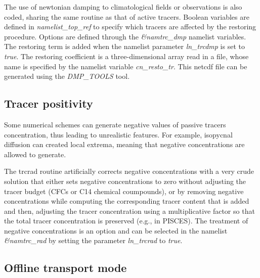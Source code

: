 \documentclass[../main/TOP_manual]{subfiles}
\begin{document}
The use of newtonian damping  to climatological fields or observations is also coded, sharing the same routine as that of active tracers.
Boolean variables are defined in \textit{namelist\_top\_ref} to specify which tracers are affected by the restoring procedure.
Options are defined through the \textit{\&namtrc\_dmp} namelist variables.
The restoring term is added when the namelist parameter \textit{ln\_trcdmp} is set to \textit{true}.
The restoring coefficient is a three-dimensional array read in a file, whose name is specified by the namelist variable \textit{cn\_resto\_tr}.
This netcdf file can be generated using the \textit{DMP\_TOOLS} tool.


\subsection{Tracer positivity}

Some numerical schemes can generate negative values of passive tracers concentration, thus leading to unrealistic features.
For example, isopycnal diffusion can created local extrema, meaning that negative concentrations are allowed to generate.

The trcrad routine artificially corrects negative concentrations with a very crude solution that either sets negative concentrations to zero without adjusting the tracer budget (CFCs or C14 chemical coumpounds), or by removing negative concentrations while computing the corresponding tracer content that is added and then, adjusting the tracer concentration using a multiplicative factor so that the total tracer concentration is preserved (e.g., in PISCES).
The treatment of negative concentrations is an option and can be selected in the namelist \textit{\&namtrc\_rad} by setting the parameter \textit{ln\_trcrad} to \textit{true}.


\subsection{Offline transport mode}
\label{Offline}
\end{document}
